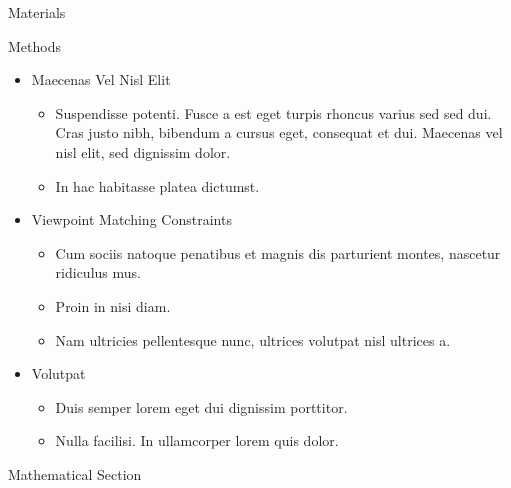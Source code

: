 \documentclass[final,hyperref={pdfpagelabels=false}]{beamer}
\begin{document}
\begin{frame}[t]
\begin{columns}[t]
\begin{column}{.465\textwidth}
\begin{block}{Materials}
\end{block}


\begin{block}{Methods}

\begin{itemize}
\item Maecenas Vel Nisl Elit
\begin{itemize}
\item Suspendisse potenti. Fusce a est eget turpis rhoncus varius sed sed dui. Cras justo nibh, bibendum a cursus eget, consequat et dui. Maecenas vel nisl elit, sed dignissim dolor. 
\item In hac habitasse platea dictumst.
\end{itemize}

\item Viewpoint Matching Constraints
\begin{itemize}
\item Cum sociis natoque penatibus et magnis dis parturient montes, nascetur ridiculus mus. 
\item Proin in nisi diam.
\item Nam ultricies pellentesque nunc, ultrices volutpat nisl ultrices a.
\end{itemize}

\item Volutpat 
\begin{itemize}
\item Duis semper lorem eget dui dignissim porttitor.
\item Nulla facilisi. In ullamcorper lorem quis dolor.
\end{itemize}
\end{itemize}

\end{block}


\begin{block}{Mathematical Section}


\end{block}
\end{column}
\end{columns}
\end{frame}
\end{document}
